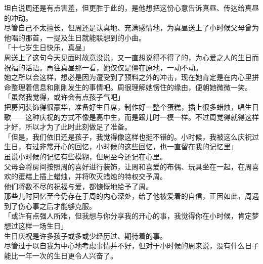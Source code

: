 坦白说周还是有点害羞，但更胜于此的，是他想把这份心意告诉真昼、传达给真昼的冲动。\\

尽管自己不太擅长，但周还是认真地、充满感情地，为真昼送上了小时候父母曾为他唱的那首，一提及生日就能联想到的小曲。\\

「十七岁生日快乐，真昼」\\

周送上了这句今天见面时故意没说，又一直想说得不得了的，为心爱之人的生日而祝福的话语。再往真昼那一看，她仅仅是僵在原地，一动不动。\\

她之所以会这样，想必是因为遭受到了预料之外的冲击，现在她肯定是在内心里拼命整理着信息和刚刚发生的事情吧。周很理解她愣住的缘由，便朝她微微一笑。\\

「虽然我觉得，或许会有点孩子气吧」\\

把房间装饰得很豪华，准备好生日席，制作好一整个蛋糕，插上很多蜡烛，唱生日歌——这种庆祝的方式不像是高中生，而是跟儿时一模一样。不过周觉得就得这样才好，所以才为了此时此刻做足了准备。\\

「但是，我们依旧还是孩子，我觉得像这样也挺不错的。小时候，我被这么庆祝过生日，有过非常开心的回忆，小时候的这些回忆，也一直留在我的记忆里」\\

虽说小时候的记忆有些模糊，但周至今还记在心里。\\

父母会将房间按照周的喜好进行装饰，让周和喜爱的布偶、玩具坐在一起，在周喜欢的蛋糕上插上蜡烛，并将吹灭蜡烛的特权交予周。\\

他们将数不尽的祝福与爱，都慷慨地给予了周。\\

那些儿时回忆至今仍存在于周的内心深处，给了他被爱着的自信，正因如此，周遇到了伤心事之后才能够克服。\\

「或许有点强人所难，但我想与你分享我的开心的事，我觉得你在小时候，肯定梦想过这样一场生日」\\

生日庆祝是许多孩子或多或少经历过、期待着的事。\\

尽管过于以自我为中心地考虑事情并不好，但对于小时候的周来说，没有什么日子能比一年一次的生日更令人兴奋了。\\

